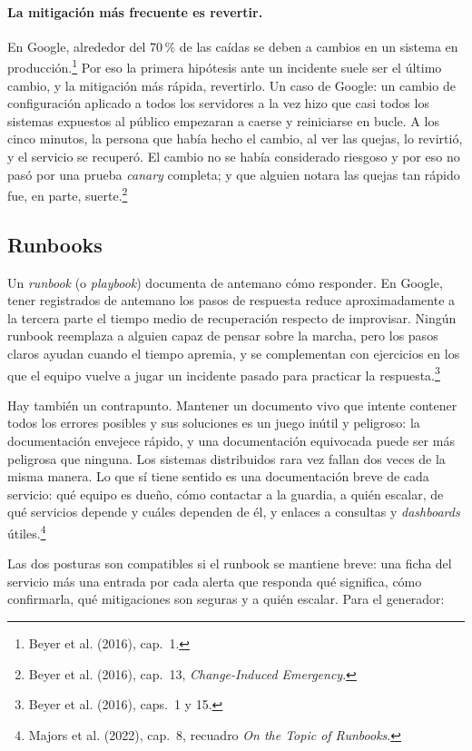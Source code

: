 \documentclass[variant=apuntes,cover=institutional,mode=screen]{ua-engineering-v6-article}
\begin{document}
\paragraph{La mitigación más frecuente es revertir.} En Google, alrededor del 70\,\% de las caídas se deben a cambios en un sistema en producción.\footnote{Beyer et al. (2016), cap.~1.} Por eso la primera hipótesis ante un incidente suele ser el último cambio, y la mitigación más rápida, revertirlo. Un caso de Google: un cambio de configuración aplicado a todos los servidores a la vez hizo que casi todos los sistemas expuestos al público empezaran a caerse y reiniciarse en bucle. A los cinco minutos, la persona que había hecho el cambio, al ver las quejas, lo revirtió, y el servicio se recuperó. El cambio no se había considerado riesgoso y por eso no pasó por una prueba \emph{canary} completa; y que alguien notara las quejas tan rápido fue, en parte, suerte.\footnote{Beyer et al. (2016), cap.~13, \emph{Change-Induced Emergency}.}

\subsection{Runbooks}

Un \emph{runbook} (o \emph{playbook}) documenta de antemano cómo responder. En Google, tener registrados de antemano los pasos de respuesta reduce aproximadamente a la tercera parte el tiempo medio de recuperación respecto de improvisar. Ningún runbook reemplaza a alguien capaz de pensar sobre la marcha, pero los pasos claros ayudan cuando el tiempo apremia, y se complementan con ejercicios en los que el equipo vuelve a jugar un incidente pasado para practicar la respuesta.\footnote{Beyer et al. (2016), caps.~1 y 15.}

Hay también un contrapunto. Mantener un documento vivo que intente contener todos los errores posibles y sus soluciones es un juego inútil y peligroso: la documentación envejece rápido, y una documentación equivocada puede ser más peligrosa que ninguna. Los sistemas distribuidos rara vez fallan dos veces de la misma manera. Lo que sí tiene sentido es una documentación breve de cada servicio: qué equipo es dueño, cómo contactar a la guardia, a quién escalar, de qué servicios depende y cuáles dependen de él, y enlaces a consultas y \emph{dashboards} útiles.\footnote{Majors et al. (2022), cap.~8, recuadro \emph{On the Topic of Runbooks}.}

Las dos posturas son compatibles si el runbook se mantiene breve: una ficha del servicio más una entrada por cada alerta que responda qué significa, cómo confirmarla, qué mitigaciones son seguras y a quién escalar. Para el generador:
\end{document}

